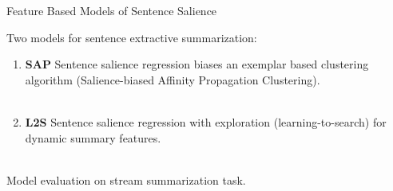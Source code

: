 \begin{frame}{Feature Based Models of Sentence Salience}

    Two models for sentence extractive summarization:

    \begin{enumerate}
     \item \textbf{SAP} Sentence salience regression biases an exemplar based
         clustering algorithm (Salience-biased Affinity Propagation Clustering). ~\\~\\
     \item \textbf{L2S} Sentence salience regression with exploration
(learning-to-search)
         for dynamic summary features.
    \end{enumerate}

    ~\\
    Model evaluation on stream summarization task.

\end{frame}


